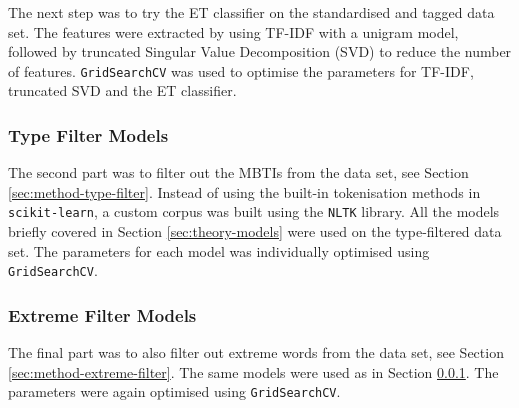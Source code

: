 The next step was to try the ET classifier on the standardised and tagged data set.
The features were extracted by using TF-IDF with a unigram model, followed by truncated Singular Value Decomposition (SVD) to reduce the number of features.
\texttt{GridSearchCV} was used to optimise the parameters for TF-IDF, truncated SVD and the ET classifier.

\subsubsection{Type Filter Models} \label{sec:method-type-filter-models}
The second part was to filter out the MBTIs from the data set, see Section \ref{sec:method-type-filter}.
Instead of using the built-in tokenisation methods in \texttt{scikit-learn}, a custom corpus was built using the \texttt{NLTK} library.
All the models briefly covered in Section \ref{sec:theory-models} were used on the type-filtered data set.
The parameters for each model was individually optimised using \texttt{GridSearchCV}.

\subsubsection{Extreme Filter Models}  \label{sec:method-extreme-filter-models}
The final part was to also filter out extreme words from the data set, see Section \ref{sec:method-extreme-filter}.
The same models were used as in Section \ref{sec:method-type-filter-models}.
The parameters were again optimised using \texttt{GridSearchCV}.